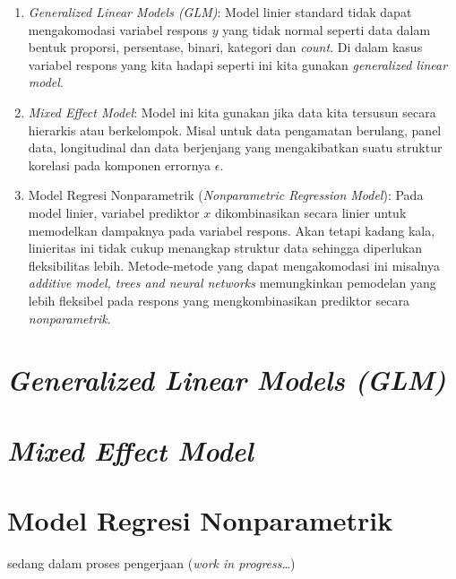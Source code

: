 \documentclass[
]{book}
\begin{document}
\begin{enumerate}
\def\labelenumi{\arabic{enumi}.}
\item
  \emph{Generalized Linear Models (GLM)}: Model linier standard tidak dapat mengakomodasi variabel respons \(y\) yang tidak normal seperti data dalam bentuk proporsi, persentase, binari, kategori dan \emph{count}. Di dalam kasus variabel respons yang kita hadapi seperti ini kita gunakan \emph{generalized linear model}.
\item
  \emph{Mixed Effect Model}: Model ini kita gunakan jika data kita tersusun secara hierarkis atau berkelompok. Misal untuk data pengamatan berulang, panel data, longitudinal dan data berjenjang yang mengakibatkan suatu struktur korelasi pada komponen errornya \(\epsilon\).
\item
  Model Regresi Nonparametrik (\emph{Nonparametric Regression Model}): Pada model linier, variabel prediktor \(x\) dikombinasikan secara linier untuk memodelkan dampaknya pada variabel respons. Akan tetapi kadang kala, linieritas ini tidak cukup menangkap struktur data sehingga diperlukan fleksibilitas lebih. Metode-metode yang dapat mengakomodasi ini misalnya \emph{additive model, trees and neural networks} memungkinkan pemodelan yang lebih fleksibel pada respons yang mengkombinasikan prediktor secara \emph{nonparametrik}.
\end{enumerate}

\hypertarget{generalized-linear-models-glm}{%
\section{\texorpdfstring{\emph{Generalized Linear Models (GLM)}}{Generalized Linear Models (GLM)}}\label{generalized-linear-models-glm}}

\hypertarget{mixed-effect-model}{%
\section{\texorpdfstring{\emph{Mixed Effect Model}}{Mixed Effect Model}}\label{mixed-effect-model}}

\hypertarget{model-regresi-nonparametrik}{%
\section{Model Regresi Nonparametrik}\label{model-regresi-nonparametrik}}

sedang dalam proses pengerjaan (\emph{work in progress\ldots{}})

  
\end{document}
